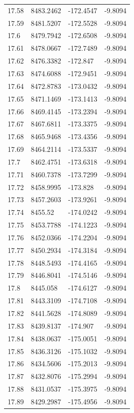 \begin{table}[H]
\begin{tabular}{llll}
17.58 & 8483.2462 & -172.4547 & -9.8094 \\
17.59 & 8481.5207 & -172.5528 & -9.8094 \\
17.6 & 8479.7942 & -172.6508 & -9.8094 \\
17.61 & 8478.0667 & -172.7489 & -9.8094 \\
17.62 & 8476.3382 & -172.847 & -9.8094 \\
17.63 & 8474.6088 & -172.9451 & -9.8094 \\
17.64 & 8472.8783 & -173.0432 & -9.8094 \\
17.65 & 8471.1469 & -173.1413 & -9.8094 \\
17.66 & 8469.4145 & -173.2394 & -9.8094 \\
17.67 & 8467.6811 & -173.3375 & -9.8094 \\
17.68 & 8465.9468 & -173.4356 & -9.8094 \\
17.69 & 8464.2114 & -173.5337 & -9.8094 \\
17.7 & 8462.4751 & -173.6318 & -9.8094 \\
17.71 & 8460.7378 & -173.7299 & -9.8094 \\
17.72 & 8458.9995 & -173.828 & -9.8094 \\
17.73 & 8457.2603 & -173.9261 & -9.8094 \\
17.74 & 8455.52 & -174.0242 & -9.8094 \\
17.75 & 8453.7788 & -174.1223 & -9.8094 \\
17.76 & 8452.0366 & -174.2204 & -9.8094 \\
17.77 & 8450.2934 & -174.3184 & -9.8094 \\
17.78 & 8448.5493 & -174.4165 & -9.8094 \\
17.79 & 8446.8041 & -174.5146 & -9.8094 \\
17.8 & 8445.058 & -174.6127 & -9.8094 \\
17.81 & 8443.3109 & -174.7108 & -9.8094 \\
17.82 & 8441.5628 & -174.8089 & -9.8094 \\
17.83 & 8439.8137 & -174.907 & -9.8094 \\
17.84 & 8438.0637 & -175.0051 & -9.8094 \\
17.85 & 8436.3126 & -175.1032 & -9.8094 \\
17.86 & 8434.5606 & -175.2013 & -9.8094 \\
17.87 & 8432.8076 & -175.2994 & -9.8094 \\
17.88 & 8431.0537 & -175.3975 & -9.8094 \\
17.89 & 8429.2987 & -175.4956 & -9.8094 \\

\end{tabular}
\end{table}
